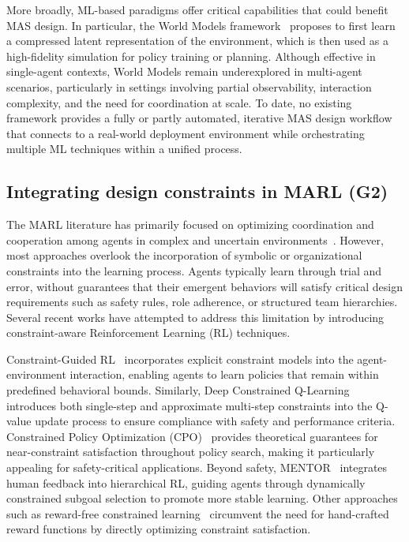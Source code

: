 \documentclass[pdflatex,sn-mathphys-num]{sn-jnl}%
\theoremstyle{thmstyleone}%
\theoremstyle{thmstyletwo}%
\theoremstyle{thmstylethree}%
\begin{document}
More broadly, ML-based paradigms offer critical capabilities that could benefit MAS design. In particular, the World Models framework~\cite{Ha2018} proposes to first learn a compressed latent representation of the environment, which is then used as a high-fidelity simulation for policy training or planning. Although effective in single-agent contexts, World Models remain underexplored in multi-agent scenarios, particularly in settings involving partial observability, interaction complexity, and the need for coordination at scale.
%
To date, no existing framework provides a fully or partly automated, iterative MAS design workflow that connects to a real-world deployment environment while orchestrating multiple ML techniques within a unified process.

\subsection{Integrating design constraints in MARL (G2)}

The MARL literature has primarily focused on optimizing coordination and cooperation among agents in complex and uncertain environments~\cite{Zhang2021, Papoudakis2021}. However, most approaches overlook the incorporation of symbolic or organizational constraints into the learning process. Agents typically learn through trial and error, without guarantees that their emergent behaviors will satisfy critical design requirements such as safety rules, role adherence, or structured team hierarchies. Several recent works have attempted to address this limitation by introducing constraint-aware Reinforcement Learning (RL) techniques.

Constraint-Guided RL~\cite{spieker2021constraint} incorporates explicit constraint models into the agent-environment interaction, enabling agents to learn policies that remain within predefined behavioral bounds. Similarly, Deep Constrained Q-Learning~\cite{kalweit2020deep} introduces both single-step and approximate multi-step constraints into the Q-value update process to ensure compliance with safety and performance criteria. Constrained Policy Optimization (CPO)~\cite{achiam2017constrained} provides theoretical guarantees for near-constraint satisfaction throughout policy search, making it particularly appealing for safety-critical applications. Beyond safety, MENTOR~\cite{zhou2025mentor} integrates human feedback into hierarchical RL, guiding agents through dynamically constrained subgoal selection to promote more stable learning. Other approaches such as reward-free constrained learning~\cite{miryoosefi2022} circumvent the need for hand-crafted reward functions by directly optimizing constraint satisfaction.
\end{document}
